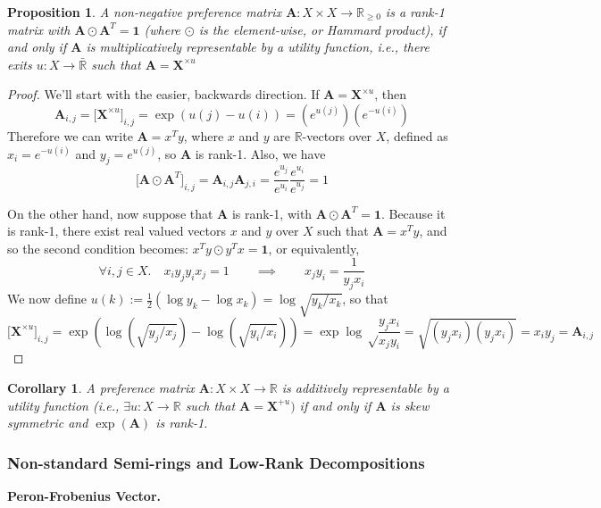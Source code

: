 \documentclass{article}
\theoremstyle{plain}
\newtheorem{coro}{Corollary}[theorem]
\newtheorem{prop}[theorem]{Proposition}
\theoremstyle{definition}
\theoremstyle{remark}
\newcommand\mat[1]{\mathbf #1}
\begin{document}
	\begin{prop}\label{prop:decomp}
		A non-negative preference matrix $\mat A : X \times X \to \mathbb R_{\geq 0}$ is a rank-1 matrix with $\mat A \odot \mat A^T = \mat 1$ (where $\odot$ is the element-wise, or Hammard product), if and only if $\mat A$ is multiplicatively representable by a utility function, i.e., there exits $u : X \to \bar{\mathbb  R}$ such that $\mat A = \mat X^{\times u}$
	\end{prop}
	\begin{proof}
		We'll start with the easier, backwards direction. If $\mat A = \mat X^{\times u}$, then
		\[ \mat A_{i,j} = \big[\mat X^{\times u}\big]_{i,j} =  \exp(u(j) - u(i)) = \left(e^{u(j)}\right)\left(e^{-u(i)}\right) \]
		Therefore we can write $\mat A =  x^T  y$, where $x$ and $y$ are $\mathbb R$-vectors over $X$, defined as $ x_i = e^{-u(i)}$ and $ y_j = e^{u(j)}$, so $\mat A$ is rank-1. Also, we have 
		\[ \big[\mat A \odot \mat A^T\big]_{i,j} =  \mat A_{i,j} \mat A_{j,i} = \frac{e^{u_j}}{e^{u_i}} \frac{e^{u_i}}{e^{u_j}} = 1\]
		
		On the other hand, now suppose that $\mat A$ is rank-1, with $\mat A \odot \mat A^T = \mat 1$. Because it is rank-1, there exist real valued vectors $x$ and $y$ over $X$ such that $\mat A  = x^T y$, and so the second condition becomes: $x^T y \odot y^T x = \mat 1$, or equivalently,
		\[ \forall i,j \in X.\quad x_i y_j y_i x_j  = 1 \qquad\implies\qquad x_j y_i = \frac{1}{y_j x_i} \]
		We now define $u(k) := \frac{1}{2} (\log y_k - \log x_k) = \log\sqrt{y_k / x_k}$, so that
		\[ \big[\mat X^{\times u}\big]_{i,j} = \exp\left(\log\left(\sqrt{y_j/x_j}\right)- \log\left(\sqrt{y_i/x_i}\right)\right) 
			= \exp\log\sqrt\frac{y_j x_i}{x_j y_i} 
			= \sqrt{(y_j x_i)(y_j x_i)} = x_i y_j = \mat A_{i,j}\]
	\end{proof}

	

	\begin{coro}
		A preference matrix $\mat A : X \times X \to \mathbb R$ is additively representable by a utility function (i.e., $\exists u : X \to \mathbb R$ such that $\mat A = \mat X^{+u})$ if and only if $\mat A$ is skew symmetric and $\exp (\mat A)$ is rank-1.
	\end{coro}
	
	
	
	\subsubsection{Non-standard Semi-rings and Low-Rank Decompositions}
	\textbf{Peron-Frobenius Vector.}
	
\end{document}

